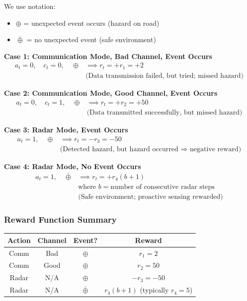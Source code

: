 \documentclass[12pt,a4paper]{article}
\begin{document}
We use notation:
\begin{itemize}
    \item $\oplus$ = unexpected event occurs (hazard on road)
    \item $\bar{\oplus}$ = no unexpected event (safe environment)
\end{itemize}

\textbf{Case 1: Communication Mode, Bad Channel, Event Occurs}
\begin{align}
a_t = 0, \quad c_t = 0, \quad \oplus &\implies r_t = +r_1 = +2 \\
&\text{(Data transmission failed, but tried; missed hazard)}
\end{align}

\textbf{Case 2: Communication Mode, Good Channel, Event Occurs}
\begin{align}
a_t = 0, \quad c_t = 1, \quad \oplus &\implies r_t = +r_2 = +50 \\
&\text{(Data transmitted successfully, but missed hazard)}
\end{align}

\textbf{Case 3: Radar Mode, Event Occurs}
\begin{align}
a_t = 1, \quad \oplus &\implies r_t = -r_3 = -50 \\
&\text{(Detected hazard, but hazard occurred $\Rightarrow$ negative reward)}
\end{align}

\textbf{Case 4: Radar Mode, No Event Occurs}
\begin{align}
a_t = 1, \quad \bar{\oplus} &\implies r_t = +r_4(b+1) \\
&\text{where } b = \text{number of consecutive radar steps} \\
&\text{(Safe environment; proactive sensing rewarded)}
\end{align}

\subsubsection{Reward Function Summary}

\begin{table}[h]
\centering
\begin{tabular}{|c|c|c|c|}
\hline
\textbf{Action} & \textbf{Channel} & \textbf{Event?} & \textbf{Reward} \\
\hline
Comm & Bad & $\oplus$ & $r_1 = 2$ \\
\hline
Comm & Good & $\oplus$ & $r_2 = 50$ \\
\hline
Radar & N/A & $\oplus$ & $-r_3 = -50$ \\
\hline
Radar & N/A & $\bar{\oplus}$ & $r_4(b+1)$ (typically $r_4 = 5$) \\
\hline
\end{tabular}
\end{table}
\end{document}
